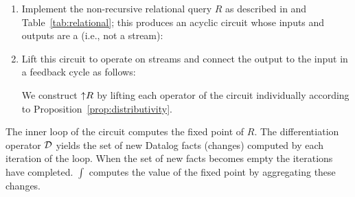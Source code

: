 \noindent 
\begin{enumerate}[nosep, leftmargin=\parindent]
\item Implement the non-recursive relational query $R$ as described in
     and Table~\ref{tab:relational}; this produces
    an acyclic circuit whose inputs and outputs are a \zr (i.e., not a stream):
    \begin{center}
    \end{center}
\item Lift this circuit to operate on streams and connect the output to the input in a feedback cycle as follows:

\noindent
{}

We construct ${\uparrow}R$ by lifting each operator of the circuit individually 
according to Proposition~\ref{prop:distributivity}.
\end{enumerate}

The inner loop of the circuit computes the fixed point of $R$.  The differentiation
operator $\mathcal{D}$ yields the set of new Datalog facts (changes) computed by each iteration of the loop.
When the set of new facts becomes empty the iterations have completed.
$\int$ computes the value of the fixed point by aggregating these changes.

